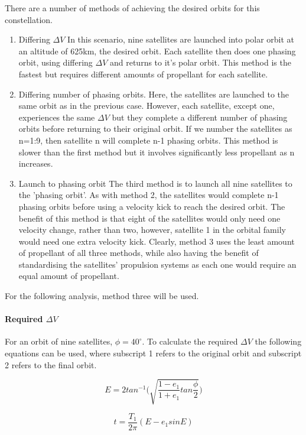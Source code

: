 There are a number of methods of achieving the desired orbits for this constellation.
\begin{enumerate}
	\item Differing $\Delta V$
	In this scenario, nine satellites are launched into polar orbit at an altitude of 625km, the desired orbit. Each satellite then does one phasing orbit, using differing $\Delta V$ and returns to it's polar orbit. This method is the fastest but requires different amounts of propellant for each satellite.
	\item Differing number of phasing orbits.
	Here, the satellites are launched to the same orbit as in the previous case. However, each satellite, except one, experiences the same $\Delta V$ but they complete a different number of phasing orbits before returning to their original orbit. If we number the satellites as n=1:9, then satellite n will complete n-1 phasing orbits. This method is slower than the first method but it involves significantly less propellant as n increases.
	\item Launch to phasing orbit
	The third method is to launch all nine satellites to the 'phasing orbit'. As with method 2, the satellites would complete n-1 phasing orbits before using a velocity kick to reach the desired orbit. The benefit of this method is that eight of the satellites would only need one velocity change, rather than two, however, satellite 1 in the orbital family would need one extra velocity kick. Clearly, method 3 uses the least amount of propellant of all three methods, while also having the benefit of standardising the satellites' propulsion systems as each one would require an equal amount of propellant.
\end{enumerate}

For the following analysis, method three will be used.

\paragraph{Required $\Delta V$}
For an orbit of nine satellites, $\phi = 40^{\circ}$. To calculate the required $\Delta V$ the following equations can be used, where subscript 1 refers to the original orbit and subscript 2 refers to the final orbit.

\begin{equation}
	E=2tan^{-1}\bigg(\sqrt{\frac{1-e_1}{1+e_1}tan\frac{\phi}{2}} \bigg)
	\label{MMeq1}
\end{equation}

\begin{equation}
	t=\frac{T_1}{2\pi}(E - e_1 sinE)
	\label{MMeq2}
\end{equation}

